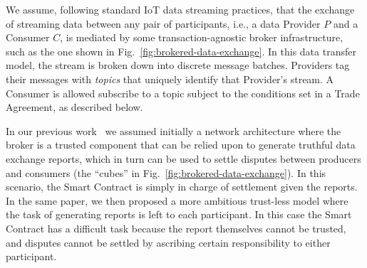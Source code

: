 \documentclass[letterpaper, 10 pt, conference]{ieeeconf}  %
\begin{document}
We assume, following standard IoT data streaming practices, that the exchange of streaming data between any pair of  participants, i.e., a data Provider  $P$ and a Consumer $C$, is  mediated by some transaction-agnostic broker infrastructure, such as the one shown in Fig.~\ref{fig:brokered-data-exchange}.
In this data transfer model, the stream is broken down into discrete message batches. Providers tag their messages with \textit{topics} that uniquely identify that Provider's stream. 
A Consumer is allowed subscribe to a topic subject to the conditions set in a Trade Agreement, as described below.

In our previous work~\cite{Missier2017} we assumed initially a network architecture where the broker is a trusted component that can be relied upon to generate truthful data exchange reports, which in turn can be used to settle disputes between producers and consumers  (the ``cubes'' in Fig.~\ref{fig:brokered-data-exchange}).
In this scenario, the Smart Contract is simply in charge of settlement given the reports. 
In the same paper, we then proposed a more ambitious trust-less model where the task of generating reports is left to each participant. In this case the Smart Contract has a difficult task because the report themselves cannot be trusted, and disputes cannot be settled by ascribing certain responsibility to either participant.


	
\end{document}
